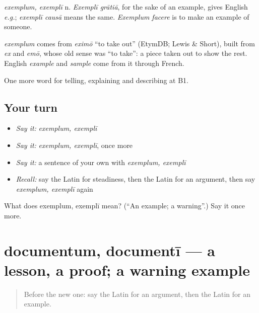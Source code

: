 \emph{exemplum, exemplī} n. \emph{Exemplī grātiā}, for the sake of an example, gives English \emph{e.g.}; \emph{exemplī causā} means the same. \emph{Exemplum facere} is to make an example of someone.

\begin{cousinweb}
\emph{exemplum} comes from \emph{eximō} \textquotedblleft{}to take out\textquotedblright{} (EtymDB; Lewis \& Short), built from \emph{ex} and \emph{emō}, whose old sense was \textquotedblleft{}to take\textquotedblright{}: a piece taken out to show the rest. English \emph{example} and \emph{sample} come from it through French.
\end{cousinweb}

\begin{grammarlens}[title={What you've built}]
One more word for telling, explaining and describing at B1.
\end{grammarlens}

\subsection*{Your turn}
\begin{itemize}
\raggedright
  \item \emph{Say it:} \emph{exemplum, exemplī}
  \item \emph{Say it:} \emph{exemplum, exemplī}, once more
  \item \emph{Say it:} a sentence of your own with \emph{exemplum, exemplī}
  \item \emph{Recall:} say the Latin for steadiness, then the Latin for an argument, then say \emph{exemplum, exemplī} again
\end{itemize}

\begin{tcolorbox}[breakable,colback=teal!4,colframe=teal!35!black,title={Before you move on}]
What does exemplum, exemplī mean? (\textquotedblleft{}An example; a warning\textquotedblright{}.) Say it once more.
\end{tcolorbox}
\section[documentum, documentī]{documentum, documentī — a lesson, a proof; a warning example}

\label{lesson:LA-C361-documentum}



\begin{quote}
Before the new one: say the Latin for an argument, then the Latin for an example.
\end{quote}

